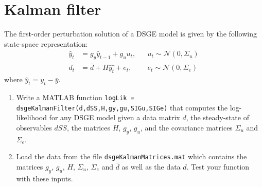 \documentclass{article}
\begin{document}
\printbibliography

\newpage

\section{Kalman filter}
The first-order perturbation solution of a DSGE model is given by the following state-space representation:
\begin{align*}
\hat{y}_t &= g_y \hat{y}_{t-1} + g_u u_t, && u_t \sim \mathcal{N}(0,\Sigma_u)
\\
d_t &= \bar{d} + H \hat{y_t} + e_t, && e_t \sim \mathcal{N}(0,\Sigma_e)
\end{align*}
where \(\hat{y}_t = y_t - \bar{y}\).

\begin{enumerate}
	\item Write a MATLAB function \texttt{logLik = dsgeKalmanFilter(d,dSS,H,gy,gu,SIGu,SIGe)}
	that computes the log-likelihood for any DSGE model given a data matrix \(d\),
	the steady-state of observables \(dSS\), the matrices \(H\), \(g_y\), \(g_u\), and the covariance matrices \(\Sigma_u\) and \(\Sigma_e\).
	\item Load the data from the file \texttt{dsgeKalmanMatrices.mat} which contains the matrices \(g_y\), \(g_u\), \(H\), \(\Sigma_u\), \(\Sigma_e\) and \(\bar{d}\) as well as the data \(d\).
	Test your function with these inputs.
\end{enumerate}
\end{document}
